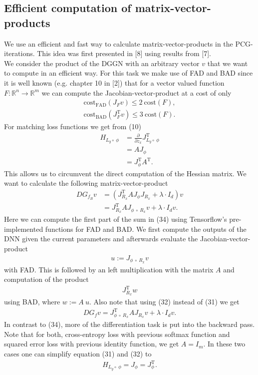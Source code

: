 \documentclass[conference]{IEEEtran}
\begin{document}
	\subsection{Efficient computation of matrix-vector-products}
	\noindent
	We use an efficient and fast way to calculate matrix-vector-products in the PCG-iterations. This idea was first presented in [8] using results from [7].\\
	We consider the product of the DGGN with an arbitrary vector $v$ that we want to compute in an efficient way.
	For this task we make use of FAD and BAD since it is well known (e.g. chapter 10 in [2]) that for a vector valued function $F:\mathbb{R}^{n}\rightarrow\mathbb{R}^{m}$ we can compute the Jacobian-vector-product at a cost of only
	\begin{align}
	\mathrm{cost}_{\text{FAD}}(J_{F}v)\leq 2\:\mathrm{cost}(F),\\
	\mathrm{cost}_{\text{BAD}}(J_{F}^{\mathrm{T}}v)\leq 3\:\mathrm{cost}(F).
	\end{align}
	For matching loss functions we get from (10)
	\begin{align}
	H_{L_{y}\circ\:\phi} &= \frac{\partial}{\partial z_{x}}J_{L_{y}\circ\:\phi}^{\mathrm{T}}\\
	&= AJ_{\phi} \\
	&= J_{\phi}^{\mathrm{T}}A^{\mathrm{T}}.
	\end{align}
	This allows us to circumvent the direct computation of the Hessian matrix. We want to calculate the following matrix-vector-product
	\begin{align}
	DG_{f_{B}}v &=  \left(J_{R_{x}}^{\mathrm{T}}AJ_{\phi}J_{R_{x}} + \lambda\cdot I_{d}\right)v\\
	&= J_{R_{x}}^{\mathrm{T}}AJ_{\phi\:\circ\: R _{x}}v + \lambda\cdot I_{d}v.
	\end{align}
	Here we can compute the first part of the sum in (34) using Tensorflow's pre-implemented functions for FAD and BAD. We first compute the outputs of the DNN given the current parameters and afterwards evaluate the Jacobian-vector-product
	\begin{align}
	u := J_{\phi\:\circ\: R _{x}}v
	\end{align}
	with FAD. This is followed by an left multiplication with the matrix $A$ and computation of the product
	\begin{align}
	J_{R_{x}}^{\mathrm{T}}w
	\end{align}
	using BAD, where $w := A\:u$. Also note that using (32) instead of (31) we get
	\begin{align}
	DG_{f}v  = J_{\phi\:\circ\:R _{x}}^{\mathrm{T}}AJ_{R _{x}}v + \lambda\cdot I_{d}v.
	\end{align}
	In contrast to (34), more of the differentiation task is put into the backward pass.\\
	Note that for both, cross-entropy loss with previous softmax function and squared error loss with previous identity function, we get $A = I_{m}$. In these two cases one can simplify equation (31) and (32) to
	\begin{align}
	H_{L_{y}\circ\:\phi} = J_{\phi} = J_{\phi}^{\mathrm{T}}.
	\end{align}
	
\end{document}
